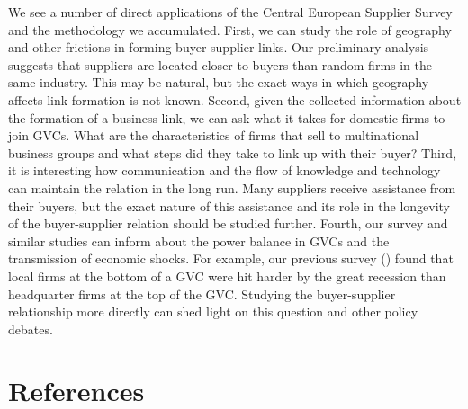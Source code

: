 \documentclass[final, dvipsnames, authoryear,12pt]{elsarticle}
\begin{document}
We see a number of direct applications of the Central European Supplier Survey and the methodology we accumulated. First, we can study the role of geography and other frictions in forming buyer-supplier links. Our preliminary analysis suggests that suppliers are located closer to buyers than random firms in the same industry. This may be natural, but the exact ways in which geography affects link formation is not known. Second, given the collected information about the formation of a business link, we can ask what it takes for domestic firms to join GVCs. What are the characteristics of firms that sell to multinational business groups and what steps did they take to link up with their buyer? Third, it is interesting how communication and the flow of knowledge and technology can maintain the relation in the long run. Many suppliers receive assistance from their buyers, but the exact nature of this assistance and its role in the longevity of the buyer-supplier relation should be studied further. Fourth, our survey and similar studies can inform about the power balance in GVCs and the transmission of economic shocks. For example, our previous survey (\cite{still_standing}) found that local firms at the bottom of a GVC were hit harder by the great recession than headquarter firms at the top of the GVC. Studying the buyer-supplier relationship more directly can shed light on this question and other policy debates.

\section{References}




\end{document}
